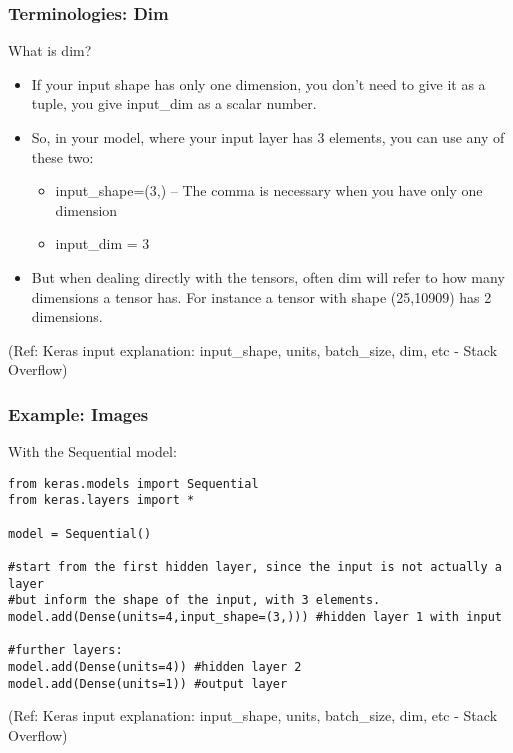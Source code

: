 \begin{frame}[fragile] \frametitle{Terminologies: Dim}

What is dim?

\begin{itemize}
\item If your input shape has only one dimension, you don't need to give it as a tuple, you give input\_dim as a scalar number.
\item So, in your model, where your input layer has 3 elements, you can use any of these two:
\begin{itemize}
\item input\_shape=(3,) -- The comma is necessary when you have only one dimension
\item input\_dim = 3
\end{itemize}
\item But when dealing directly with the tensors, often dim will refer to how many dimensions a tensor has. For instance a tensor with shape (25,10909) has 2 dimensions.
\end{itemize}

\tiny{(Ref: Keras input explanation: input\_shape, units, batch\_size, dim, etc - Stack Overflow)}
\end{frame}

\begin{frame}[fragile] \frametitle{Example: Images}

With the Sequential model:

\begin{lstlisting}
from keras.models import Sequential  
from keras.layers import *  

model = Sequential()    

#start from the first hidden layer, since the input is not actually a layer   
#but inform the shape of the input, with 3 elements.    
model.add(Dense(units=4,input_shape=(3,))) #hidden layer 1 with input

#further layers:    
model.add(Dense(units=4)) #hidden layer 2
model.add(Dense(units=1)) #output layer   
\end{lstlisting}

\tiny{(Ref: Keras input explanation: input\_shape, units, batch\_size, dim, etc - Stack Overflow)}
\end{frame}

